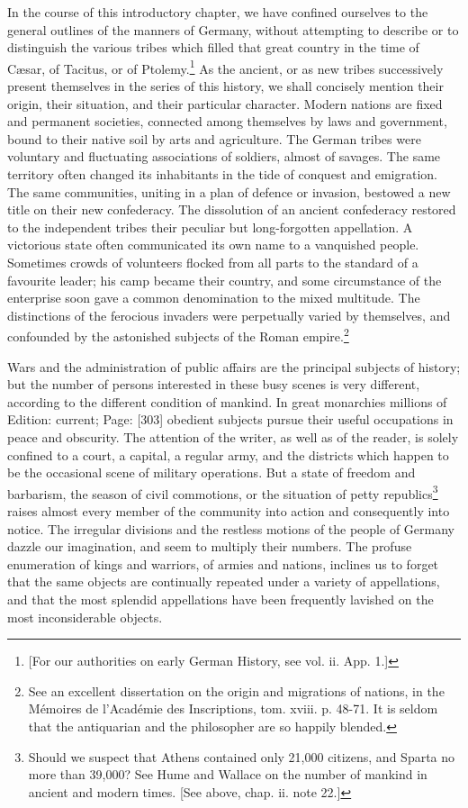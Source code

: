 In the course of this introductory chapter, we have confined ourselves to the general outlines of the manners of Germany, without attempting to describe or to distinguish the various tribes which filled that great country in the time of Cæsar, of Tacitus, or of Ptolemy.\footnote{[For our authorities on early German History, see vol. ii. App. 1.]} As the ancient, or as new tribes successively present themselves in the series of this history, we shall concisely mention their origin, their situation, and their particular character. Modern nations are fixed and permanent societies, connected among themselves by laws and government, bound to their native soil by arts and agriculture. The German tribes were voluntary and fluctuating associations of soldiers, almost of savages. The same territory often changed its inhabitants in the tide of conquest and emigration. The same communities, uniting in a plan of defence or invasion, bestowed a new title on their new confederacy. The dissolution of an ancient confederacy restored to the independent tribes their peculiar but long-forgotten appellation. A victorious state often communicated its own name to a vanquished people. Sometimes crowds of volunteers flocked from all parts to the standard of a favourite leader; his camp became their country, and some circumstance of the enterprise soon gave a common denomination to the mixed multitude. The distinctions of the ferocious invaders were perpetually varied by themselves, and confounded by the astonished subjects of the Roman empire.\footnote{See an excellent dissertation on the origin and migrations of nations, in the Mémoires de l\texthebrew{}’Académie des Inscriptions, tom. xviii. p. 48-71. It is seldom that the antiquarian and the philosopher are so happily blended.}

Wars and the administration of public affairs are the principal subjects of history; but the number of persons interested in these busy scenes is very different, according to the different condition of mankind. In great monarchies millions of Edition: current; Page: [303] obedient subjects pursue their useful occupations in peace and obscurity. The attention of the writer, as well as of the reader, is solely confined to a court, a capital, a regular army, and the districts which happen to be the occasional scene of military operations. But a state of freedom and barbarism, the season of civil commotions, or the situation of petty republics\footnote{Should we suspect that Athens contained only 21,000 citizens, and Sparta no more than 39,000? See Hume and Wallace on the number of mankind in ancient and modern times. [See above, chap. ii. note 22.]} raises almost every member of the community into action and consequently into notice. The irregular divisions and the restless motions of the people of Germany dazzle our imagination, and seem to multiply their numbers. The profuse enumeration of kings and warriors, of armies and nations, inclines us to forget that the same objects are continually repeated under a variety of appellations, and that the most splendid appellations have been frequently lavished on the most inconsiderable objects.

